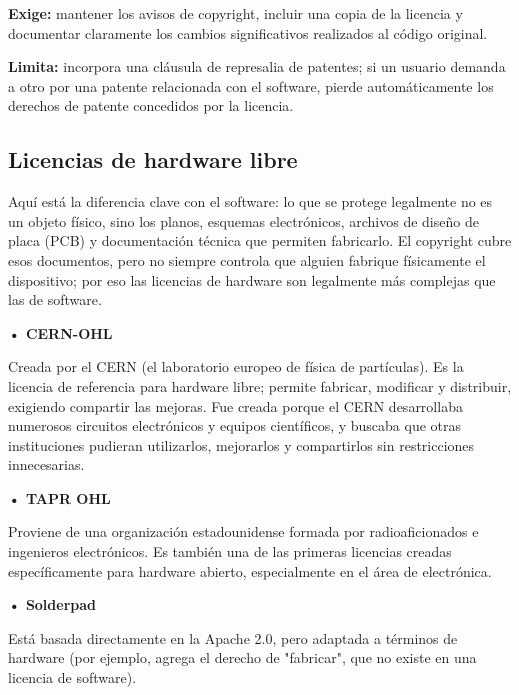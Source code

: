 \documentclass[12pt]{article}
\begin{document}
    \textbf{Exige:} mantener los avisos de copyright, incluir una copia de la licencia y documentar claramente los cambios significativos realizados al código original.

    \textbf{Limita:} incorpora una cláusula de represalia de patentes; si un usuario demanda a otro por una patente relacionada con el software, pierde automáticamente los derechos de patente concedidos por la licencia.
	
	\subsection{Licencias de hardware libre}

    Aquí está la diferencia clave con el software: lo que se protege legalmente no es un objeto físico, sino los planos, esquemas electrónicos, archivos de diseño de placa (PCB) y documentación técnica que permiten fabricarlo. El copyright cubre esos documentos, pero no siempre controla que alguien fabrique físicamente el dispositivo; por eso las licencias de hardware son legalmente más complejas que las de software.

    \smallskip

    \hspace*{\parindent}\textbf{• CERN-OHL}

    Creada por el CERN (el laboratorio europeo de física de partículas). Es la licencia de referencia para hardware libre; permite fabricar, modificar y distribuir, exigiendo compartir las mejoras. Fue creada porque el CERN desarrollaba numerosos circuitos electrónicos y equipos científicos, y buscaba que otras instituciones pudieran utilizarlos, mejorarlos y compartirlos sin restricciones innecesarias.

    \medskip

    \hspace*{\parindent}\textbf{• TAPR OHL}

    Proviene de una organización estadounidense formada por radioaficionados e ingenieros electrónicos. Es también una de las primeras licencias creadas específicamente para hardware abierto, especialmente en el área de electrónica.

    \medskip

    \hspace*{\parindent}\textbf{• Solderpad}

    Está basada directamente en la Apache 2.0, pero adaptada a términos de hardware (por ejemplo, agrega el derecho de "fabricar", que no existe en una licencia de software).
	
\end{document}
